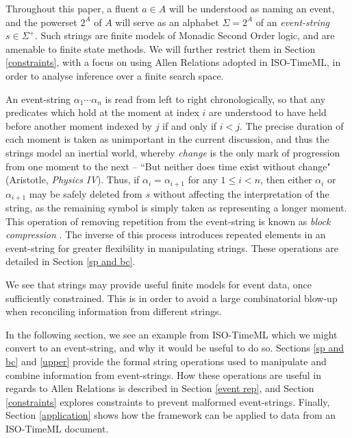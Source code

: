 \documentclass[a4paper,11pt,leqno]{article}
\begin{document}
Throughout this paper, a fluent $a \in A$ will be understood as naming 
an event, and the powerset $2^{A}$ of $A$ will serve as an alphabet $\Sigma = 
2^{A}$ of an \textit{event-string} $s \in \Sigma^+$. Such strings are finite 
models of Monadic Second Order logic, and are amenable to finite state methods. 
We will further restrict them in Section \ref{constraints}, with a focus on 
using Allen Relations adopted in ISO-TimeML, in order to analyse inference over 
a finite search space.

An event-string $\alpha_1 \cdots \alpha_n$ is read from left to right 
chronologically, 
so that any predicates which hold at the moment at index $i$ are understood to 
have held before another moment indexed by $j$ if and only if $i < j$. The 
precise duration of each moment is taken as unimportant in the current 
discussion, 
and thus the strings model an inertial world, whereby \textit{change} is the 
only mark of progression from one moment to the next -- ``But neither does time 
exist without change" (Aristotle, \textit{Physics IV}). Thus, if $\alpha_i = 
\alpha_{i+1}$ for any 
$1 \leq i < n$, then either $\alpha_i$ or $\alpha_{i+1}$ may be safely deleted 
from $s$ without 
affecting the interpretation of the string, as the remaining symbol is simply 
taken as representing a longer moment. This operation of removing 
repetition from 
the event-string is known as \textit{block compression} 
\citep{fernando2016regular}. The inverse of this process introduces repeated 
elements in an event-string for greater flexibility in manipulating strings. 
These operations are detailed in Section \ref{sp and bc}.

We see that strings may provide useful finite models for event data, once 
sufficiently constrained. This is in order to avoid a large combinatorial 
blow-up when reconciling information from different strings.

In the following section, we see an example from ISO-TimeML which we might 
convert to an event-string, and why it would be useful to do so. Sections 
\ref{sp and bc} and \ref{upper} provide the formal string operations used to 
manipulate and combine information from event-strings. How these operations are 
useful in regards to Allen Relations is described in Section \ref{event rep}, 
and Section \ref{constraints} explores constraints to prevent malformed 
event-strings. Finally, Section \ref{application} shows how the framework can 
be 
applied to data from an ISO-TimeML document.
\end{document}
